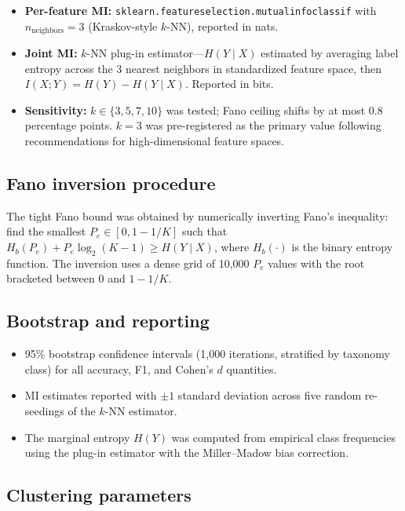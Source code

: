 \documentclass[11pt,a4paper]{article}
\renewcommand{\_}{\oldunderscore\allowbreak}
\begin{document}
\begin{itemize}
  \item \textbf{Per-feature MI:}
        \texttt{sklearn.feature\_selection.mutual\_info\_classif} with
        $n_{\text{neighbors}} = 3$ (Kraskov-style $k$-NN), reported in nats.
  \item \textbf{Joint MI:} $k$-NN plug-in estimator---$H(Y \mid X)$ estimated
        by averaging label entropy across the 3 nearest neighbors in
        standardized feature space, then $I(X;Y) = H(Y) - H(Y \mid X)$.
        Reported in bits.
  \item \textbf{Sensitivity:} $k \in \{3, 5, 7, 10\}$ was tested; Fano ceiling
        shifts by at most 0.8 percentage points. $k = 3$ was pre-registered as
        the primary value following recommendations for high-dimensional feature
        spaces.
\end{itemize}

\subsection{Fano inversion procedure}

The tight Fano bound was obtained by numerically inverting Fano's
inequality: find the smallest $P_e \in [0, 1 - 1/K]$ such that
$H_b(P_e) + P_e \log_2(K - 1) \geq H(Y \mid X)$,
where $H_b(\cdot)$ is the binary entropy function. The inversion uses
a dense grid of 10{,}000 $P_e$ values with the root bracketed between
$0$ and $1 - 1/K$.

\subsection{Bootstrap and reporting}

\begin{itemize}
  \item 95\% bootstrap confidence intervals (1{,}000 iterations, stratified by
        taxonomy class) for all accuracy, F1, and Cohen's $d$ quantities.
  \item MI estimates reported with $\pm 1$ standard deviation across five random
        re-seedings of the $k$-NN estimator.
  \item The marginal entropy $H(Y)$ was computed from empirical class frequencies
        using the plug-in estimator with the Miller--Madow bias correction.
\end{itemize}

\subsection{Clustering parameters}
\end{document}

